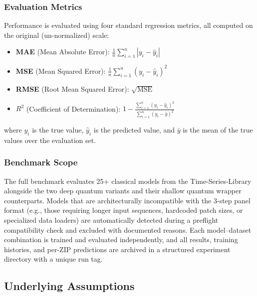 \documentclass[11pt]{article}
\begin{document}
\subsubsection*{Evaluation Metrics}

Performance is evaluated using four standard regression metrics, all computed on the original (un-normalized) scale:

\begin{itemize}
  \item \textbf{MAE} (Mean Absolute Error): $\frac{1}{n}\sum_{i=1}^{n}|y_i - \hat{y}_i|$
  \item \textbf{MSE} (Mean Squared Error): $\frac{1}{n}\sum_{i=1}^{n}(y_i - \hat{y}_i)^2$
  \item \textbf{RMSE} (Root Mean Squared Error): $\sqrt{\text{MSE}}$
  \item \textbf{$R^2$} (Coefficient of Determination): $1 - \frac{\sum_{i=1}^{n}(y_i - \hat{y}_i)^2}{\sum_{i=1}^{n}(y_i - \bar{y})^2}$
\end{itemize}

where $y_i$ is the true value, $\hat{y}_i$ is the predicted value, and $\bar{y}$ is the mean of the true values over the evaluation set.

\subsubsection*{Benchmark Scope}

The full benchmark evaluates 25+ classical models from the Time-Series-Library alongside the two deep quantum variants and their shallow quantum wrapper counterparts. Models that are architecturally incompatible with the 3-step panel format (e.g., those requiring longer input sequences, hardcoded patch sizes, or specialized data loaders) are automatically detected during a preflight compatibility check and excluded with documented reasons. Each model--dataset combination is trained and evaluated independently, and all results, training histories, and per-ZIP predictions are archived in a structured experiment directory with a unique run tag.

\subsection{Underlying Assumptions}
\end{document}
